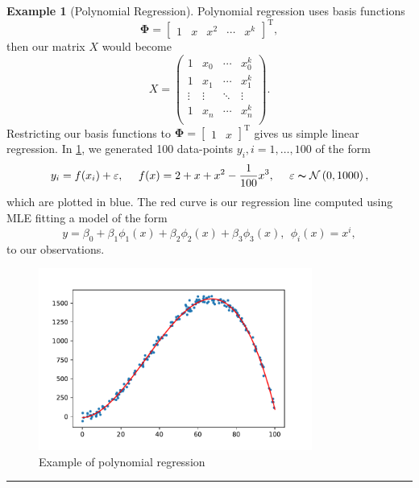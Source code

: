 \documentclass[10pt,a4paper]{article}
\numberwithin{equation}{section}
\theoremstyle{plain}
\theoremstyle{definition}
\theoremstyle{own}
\newtheorem{example}{Example}[section]
\begin{document}
\begin{example}[Polynomial Regression]
Polynomial regression uses basis functions
\begin{equation}
\boldsymbol\Phi = \left[ \begin{matrix} 1 & x & x^2 & \cdots & x^k  \end{matrix} \right]^{\text{T}},
\end{equation}
then our matrix $X$ would become
\begin{equation}
X = \left( \begin{matrix}
1 & x_0 & \cdots & x_0^k \\
1 & x_1 & \cdots & x_1^k \\
\vdots & \vdots & \ddots & \vdots \\
1 & x_n & \cdots & x_n^k \\
\end{matrix} \right).
\end{equation}
Restricting our basis functions to $\boldsymbol\Phi = [ \begin{matrix} 1 & x \end{matrix} ]^{\text{T}}$ gives us simple linear regression. In \cref{polybf}, we generated 100 data-points $y_i, i = 1, \ldots, 100$ of the form
\begin{equation}
y_i = f(x_i) + \varepsilon, ~~~~ f(x) = 2 + x + x^2 - \frac{1}{100} x^3, ~~~~ \varepsilon \thicksim \mathcal{N} \left( 0, 1000 \right),
\end{equation}
which are plotted in blue. The red curve is our regression line computed using MLE fitting a model of the form
\begin{equation}
y = \beta_0 + \beta_1 \phi_1(x) + \beta_2 \phi_2(x) + \beta_3 \phi_3(x), ~~ \phi_i(x) = x^i,
\end{equation}
to our observations.
\begin{figure}[H]
\centering
\includegraphics[width = 0.8\textwidth]{polyBF_example}
\caption{Example of polynomial regression}
\label{polybf}
\end{figure}
\hrule
\vspace{2mm}
\end{example}
\end{document}
